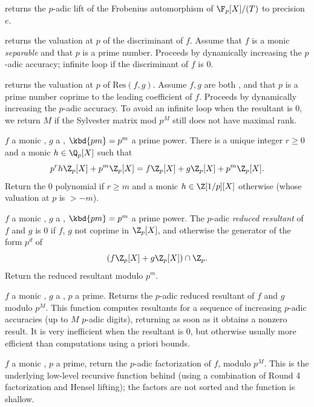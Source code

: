  returns the $p$-adic lift
of the Frobenius automorphism of $\F_p[X]/(T)$ to precision $e$.

 returns the valuation at $p$ of the
discriminant of $f$. Assume that $f$ is a monic \emph{separable} 
and that $p$ is a prime number. Proceeds by dynamically increasing the
$p$-adic accuracy; infinite loop if the discriminant of $f$ is
$0$.

 returns the
valuation at $p$ of $\text{Res}(f,g)$. Assume $f,g$ are both ,
and that $p$ is a prime number coprime to the leading coefficient of $f$.
Proceeds by dynamically increasing the $p$-adic accuracy.
To avoid an infinite loop when the resultant is $0$, we return $M$ if
the Sylvester matrix mod $p^M$ still does not have maximal rank.

 $f$ a monic ,
$g$ a , $\kbd{pm} = p^m$ a prime power. There is a unique integer
$r\geq 0$ and a monic $h\in \Q_p[X]$ such that
$$p^rh\Z_p[X] + p^m\Z_p[X] = f\Z_p[X] + g\Z_p[X] + p^m\Z_p[X].$$
Return the $0$ polynomial if $r\geq m$ and a monic $h\in\Z[1/p][X]$ otherwise
(whose valuation at $p$ is $> -m$).

 $f$ a monic
, $g$ a , $\kbd{pm} = p^m$ a prime power. The $p$-adic
\emph{reduced resultant} of $f$ and $g$ is
$0$ if $f$, $g$ not coprime in $\Z_p[X]$, and otherwise the generator of the
form $p^d$ of
$$ (f\Z_p[X] + g\Z_p[X])\cap \Z_p. $$
Return the reduced resultant modulo $p^m$.

 $f$
a monic , $g$ a , $p$ a prime. Returns
the $p$-adic reduced resultant of $f$ and $g$ modulo $p^M$. This function
computes resultants for a sequence of increasing $p$-adic accuracies
(up to $M$ $p$-adic digits), returning as soon as it obtains a nonzero
result. It is very inefficient when the resultant is $0$, but otherwise
usually more efficient than computations using a priori bounds.

 $f$ a monic
, $p$ a prime, return the $p$-adic factorization of $f$, modulo
$p^M$. This is the underlying low-level recursive function behind
 (using a combination of Round 4 factorization and Hensel
lifting); the factors are not sorted and the function is shallow.

